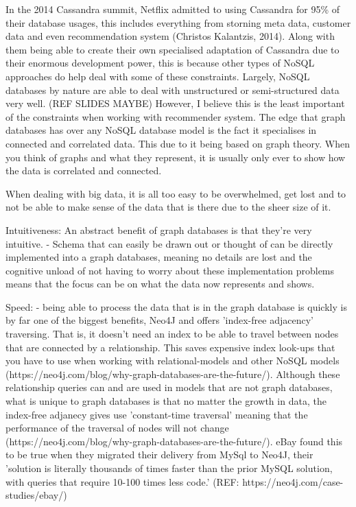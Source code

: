 \documentclass[a4paper]{article}
\begin{document}
In the 2014 Cassandra summit, Netflix admitted to using Cassandra for 95\% of their database usages, this includes everything from storning meta data, customer data and even recommendation system (Christos Kalantzis, 2014). Along with them being able to create their own specialised adaptation of Cassandra due to their enormous development power, this is because other types of NoSQL approaches do help deal with some of these constraints. Largely, NoSQL databases by nature are able to deal with unstructured or semi-structured data very well. (REF SLIDES MAYBE) However, I believe this is the least important of the constraints when working with recommender system. The edge that graph databases has over any NoSQL database model is the fact it specialises in connected and correlated data. This due to it being based on graph theory. When you think of graphs and what they represent, it is usually only ever to show how the data is correlated and connected.

When dealing with big data, it is all too easy to be overwhelmed, get lost and to not be able to make sense of the data that is there due to the sheer size of it. 

Intuitiveness:
An abstract benefit of graph databases is that they're very intuitive.
- Schema that can easily be drawn out or thought of can be directly implemented into a graph databases, meaning no details are lost and the cognitive unload of not having to worry about these implementation problems means that the focus can be on what the data now represents and shows.

Speed:
- being able to process the data that is in the graph database is quickly is by far one of the biggest benefits, Neo4J and offers 'index-free adjacency' traversing. That is, it doesn't need an index to be able to travel between nodes that are connected by a relationship. This saves expensive index look-ups that you have to use when working with relational-models and other NoSQL models (https://neo4j.com/blog/why-graph-databases-are-the-future/). Although these relationship queries can and are used in models that are not graph databases, what is unique to graph databases is that no matter the growth in data, the index-free adjanecy gives use 'constant-time traversal' meaning that the performance of the traversal of nodes will not change (https://neo4j.com/blog/why-graph-databases-are-the-future/). eBay found this to be true when they migrated their delivery from MySql to Neo4J, their 'solution is literally thousands of times faster than the prior MySQL solution, with queries that require 10-100 times less code.' (REF: https://neo4j.com/case-studies/ebay/)
\end{document}
